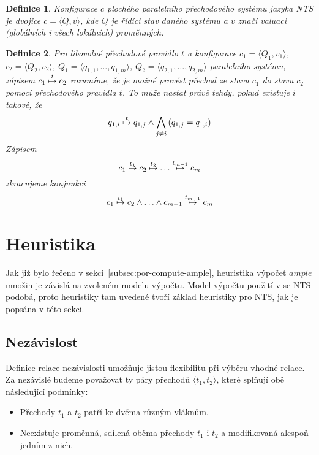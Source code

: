 \documentclass{fithesis2}
\newtheorem{definition}{Definice}
\newcommand{\tuple}[1]{\langle #1 \rangle}
\begin{document}
\begin{definition}
\textit{Konfigurace} $c$ plochého paralelního přechodového systému jazyka NTS je dvojice $c = \tuple{Q, v}$, kde $Q$ je řídící stav daného systému a $v$ značí valuaci (globálních i všech lokálních) proměnných.
\end{definition}

\begin{definition}
Pro libovolné přechodové pravidlo $t$ a konfigurace $c_1 = \tuple{Q_1, v_1}$, $c_2=\tuple{Q_2, v_2}$, $Q_1 = \tuple{q_{1,1}, \ldots, q_{1, m}}$, $Q_2 = \tuple{q_{2,1}, \ldots, q_{2, m}}$ paralelního systému, zápisem $c_1 \overset{t}{\mapsto} c_2$ rozumíme, že je možné provést přechod ze stavu $c_1$ do stavu $c_2$ pomocí přechodového pravidla $t$. To může nastat právě tehdy, pokud existuje $i$ takové, že
\begin{equation}
q_{1,i} \overset{t}{\mapsto} q_{1,j} \land \bigwedge_{j \neq i}\left({q_{1,j} = q_{1,i}}\right)
\end{equation}
Zápisem
\begin{equation*}
c_1 \overset{t_1}{\mapsto} c_2 \overset{t_2}{\mapsto} \ldots \overset{t_{m-1}}{\mapsto} c_m
\end{equation*}
zkracujeme konjunkci
\begin{equation*}
c_1 \overset{t_1}{\mapsto} c_2 \land \ldots \land c_{m-1} \overset{t_{m-1}}{\mapsto} c_m
\end{equation*}
\end{definition}


\section{Heuristika}
Jak již bylo řečeno v sekci~\ref{subsec:por-compute-ample}, heuristika výpočet $\mathit{ample}$ množin je závislá na zvoleném modelu výpočtu. Model výpočtu použití v \cite{CLARKE} se NTS podobá, proto heuristiky tam uvedené tvoří základ heuristiky pro NTS, jak je popsána v této sekci.

\subsection{Nezávislost}
Definice relace nezávislosti umožňuje jistou flexibilitu při výběru vhodné relace. Za nezávislé budeme považovat ty páry přechodů $\tuple{t_1, t_2}$, které splňují obě následující podmínky:
\begin{itemize}
\item Přechody $t_1$ a $t_2$ patří ke dvěma různým vláknům.
\item Neexistuje proměnná, sdílená oběma přechody $t_1$ i $t_2$ a modifikovaná alespoň jedním z nich.
\end{itemize}
\end{document}
